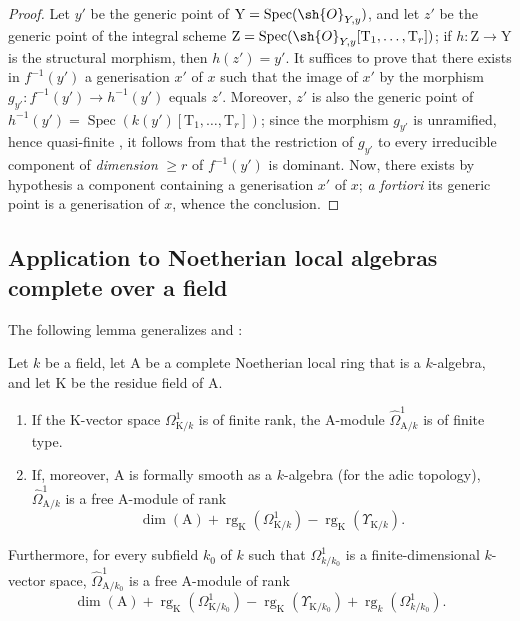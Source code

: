 \begin{proof}
Let $y'$ be the generic point of $\mathrm{Y}=\operatorname{Spec}(\sh{O}_{Y,y})$, and let $z'$ be the generic point of the integral scheme $\mathrm{Z}=\operatorname{Spec}(\sh{O}_{Y,y}[\mathrm{T}_1,\ldots,\mathrm{T}_r])$; if $h:\mathrm{Z}\to\mathrm{Y}$ is the structural morphism, then $h(z')=y'$.
It suffices to prove that there exists in $f^{-1}(y')$ a generisation $x'$ of $x$ such that the image of $x'$ by the morphism $g_{y'}:f^{-1}(y')\to h^{-1}(y')$ equals $z'$.
Moreover, $z'$ is also the generic point of $h^{-1}(y')=\operatorname{Spec}(k(y')[\mathrm{T}_1,\ldots,\mathrm{T}_r])$; since the morphism $g_{y'}$ is unramified, hence quasi-finite , it follows from  that the restriction of $g_{y'}$ to every irreducible component of \emph{dimension} $\geq r$ of $f^{-1}(y')$ is dominant.
Now, there exists by hypothesis a component containing a generisation $x'$ of $x$; \emph{a fortiori} its generic point is a generisation of $x$, whence the conclusion.
\end{proof}

\subsection{Application to Noetherian local algebras complete over a field}
\label{subsection:IV.18.11}

The following lemma generalizes  and :

\begin{lemma}[18.11.1]
\label{IV.18.11.1}
Let $k$ be a field, let $\mathrm{A}$ be a complete Noetherian local ring that is a $k$-algebra, and let $\mathrm{K}$ be the residue field of $\mathrm{A}$.
\begin{enumerate}[label=(\roman*)]
  \item If the $\mathrm{K}$-vector space $\Omega^1_{\mathrm{K}/k}$ is of finite rank, the $\mathrm{A}$-module $\hat{\Omega}^1_{\mathrm{A}/k}$ is of finite type.
  \item If, moreover, $\mathrm{A}$ is formally smooth as a $k$-algebra (for the adic topology), $\hat{\Omega}^1_{\mathrm{A}/k}$ is a free $\mathrm{A}$-module of rank
\[
  \dim(\mathrm{A})+\operatorname{rg}_{\mathrm{K}}(\Omega^1_{\mathrm{K}/k})-\operatorname{rg}_{\mathrm{K}}(\Upsilon_{\mathrm{K}/k}).
\]
\end{enumerate}
Furthermore, for every subfield $k_0$ of $k$ such that $\Omega^1_{k/k_0}$ is a finite-dimensional $k$-vector space, $\hat{\Omega}^1_{\mathrm{A}/k_0}$ is a free $\mathrm{A}$-module of rank
\[
  \dim(\mathrm{A})+\operatorname{rg}_{\mathrm{K}}(\Omega^1_{\mathrm{K}/k_0})-\operatorname{rg}_{\mathrm{K}}(\Upsilon_{\mathrm{K}/k_0})+\operatorname{rg}_{k}(\Omega^1_{k/k_0}).
\]
\end{lemma}

